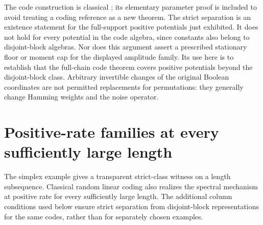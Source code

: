 \documentclass[11pt]{article}
\begin{document}
The code construction is classical \cite{wootters}; its elementary parameter proof is included to avoid treating a coding reference as a new theorem. The strict separation is an existence statement for the full-support positive potentials just exhibited. It does not hold for every potential in the code algebra, since constants also belong to disjoint-block algebras. Nor does this argument assert a prescribed stationary floor or moment cap for the displayed amplitude family. Its use here is to establish that the full-chain code theorem covers positive potentials beyond the disjoint-block class. Arbitrary invertible changes of the original Boolean coordinates are not permitted replacements for permutations: they generally change Hamming weights and the noise operator.

\section{Positive-rate families at every sufficiently large length}
The simplex example gives a transparent strict-class witness on a length subsequence. Classical random linear coding also realizes the spectral mechanism at positive rate for every sufficiently large length. The additional column conditions used below ensure strict separation from disjoint-block representations for the same codes, rather than for separately chosen examples.
\end{document}
